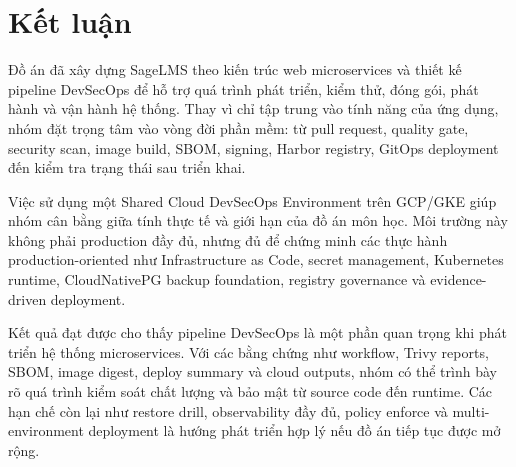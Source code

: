 \chapter{Kết luận}
\label{chap:conclusion}

Đồ án đã xây dựng SageLMS theo kiến trúc web microservices và thiết kế pipeline DevSecOps để hỗ trợ quá trình phát triển, kiểm thử, đóng gói, phát hành và vận hành hệ thống. Thay vì chỉ tập trung vào tính năng của ứng dụng, nhóm đặt trọng tâm vào vòng đời phần mềm: từ pull request, quality gate, security scan, image build, SBOM, signing, Harbor registry, GitOps deployment đến kiểm tra trạng thái sau triển khai.

Việc sử dụng một Shared Cloud DevSecOps Environment trên GCP/GKE giúp nhóm cân bằng giữa tính thực tế và giới hạn của đồ án môn học. Môi trường này không phải production đầy đủ, nhưng đủ để chứng minh các thực hành production-oriented như Infrastructure as Code, secret management, Kubernetes runtime, CloudNativePG backup foundation, registry governance và evidence-driven deployment.

Kết quả đạt được cho thấy pipeline DevSecOps là một phần quan trọng khi phát triển hệ thống microservices. Với các bằng chứng như workflow, Trivy reports, SBOM, image digest, deploy summary và cloud outputs, nhóm có thể trình bày rõ quá trình kiểm soát chất lượng và bảo mật từ source code đến runtime. Các hạn chế còn lại như restore drill, observability đầy đủ, policy enforce và multi-environment deployment là hướng phát triển hợp lý nếu đồ án tiếp tục được mở rộng.
